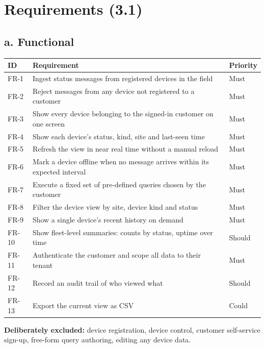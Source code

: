 \documentclass[11pt,a4paper]{article}
\begin{document}
\section{Requirements (3.1)}

\subsection*{a. Functional}

\begin{center}
\small
\begin{tabularx}{\textwidth}{@{}l X l@{}}
\toprule
\textbf{ID} & \textbf{Requirement} & \textbf{Priority} \\
\midrule
FR-1  & Ingest status messages from registered devices in the field & Must \\
FR-2  & Reject messages from any device not registered to a customer & Must \\
FR-3  & Show every device belonging to the signed-in customer on one screen & Must \\
FR-4  & Show each device's status, kind, site and last-seen time & Must \\
FR-5  & Refresh the view in near real time without a manual reload & Must \\
FR-6  & Mark a device offline when no message arrives within its expected interval & Must \\
FR-7  & Execute a fixed set of pre-defined queries chosen by the customer & Must \\
FR-8  & Filter the device view by site, device kind and status & Must \\
FR-9  & Show a single device's recent history on demand & Must \\
FR-10 & Show fleet-level summaries: counts by status, uptime over time & Should \\
FR-11 & Authenticate the customer and scope all data to their tenant & Must \\
FR-12 & Record an audit trail of who viewed what & Should \\
FR-13 & Export the current view as CSV & Could \\
\bottomrule
\end{tabularx}
\end{center}

\noindent
\textbf{Deliberately excluded:} device registration, device control, customer
self-service sign-up, free-form query authoring, editing any device data.
\end{document}
